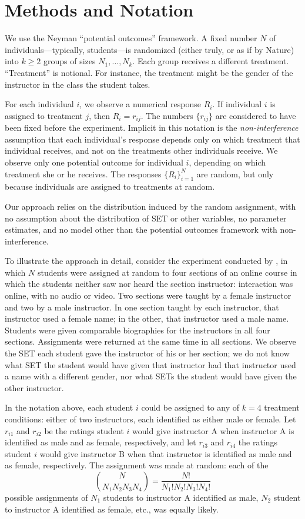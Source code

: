\documentclass[12pt]{article}
\newcommand{\beq}{\begin{equation}}
\newcommand{\eeq}{\end{equation}}
\begin{document}
\section{Methods and Notation}
We use the Neyman ``potential outcomes'' framework.
A fixed number $N$ of individuals---typically, students---is randomized (either truly, or
as if by Nature) into 
$k \ge 2$ groups of sizes $N_1, \ldots, N_k$.
Each group receives a different treatment.
``Treatment'' is notional. 
For instance, the treatment might be the gender of the
instructor in the class the student takes.

For each individual $i$, we observe a numerical response $R_i$.
If individual $i$ is assigned to treatment $j$, then $R_i = r_{ij}$.
The numbers $\{r_{ij}\}$ are considered to have been fixed before the experiment.
Implicit in this notation is the \emph{non-interference} assumption that
each individual's response depends only on which treatment that individual receives, 
and not on the treatments other individuals receive.
We observe only one potential outcome for individual $i$, 
depending on which treatment she or he receives.
The responses $\{R_i\}_{i=1}^N$ are random, but only because individuals are 
assigned to treatments at random.

Our approach relies on the distribution induced by the random
assignment, with no assumption about the distribution of SET or other variables, 
no parameter estimates, and no model other than the potential outcomes 
framework with non-interference.

To illustrate the approach in detail, consider the experiment conducted by \citet{MacNell2014},
in which $N$ students were assigned at random to four sections of an online course
in which the students neither saw nor heard the section instructor: interaction was online, with no
audio or video.
Two sections were taught by a female instructor and two by a male instructor.
In one section taught by each instructor, that instructor used a female name; in the other, 
that instructor used a male name.
Students were given comparable biographies for the instructors in all four sections.
Assignments were returned at the same time in all sections.
We observe the SET each student gave the instructor of his or her section;
we do not know what SET the student would have given that instructor had that instructor
used a name with a different gender, nor what SETs the student would have given the other instructor.

In the notation above, each student $i$ could be assigned to any of $k=4$ treatment conditions:
either of two instructors, each identified as either male or female.
Let $r_{i1}$ and $r_{i2}$ be the ratings student $i$ would give instructor A when instructor 
A is identified as male and as female, respectively, and let 
$r_{i3}$ and $r_{i4}$ the ratings student $i$ would give instructor B when that instructor
is identified as male and as female, respectively.
The assignment was made at random: each of the
\beq
 {{N}\choose{N_1 N_2 N_3 N_4}} = \frac{N!}{N_1! N_2! N_3! N_4!}
\eeq
possible assignments of $N_1$ students to instructor A identified as male,
$N_2$ student to instructor A identified as female, etc., was equally likely.
\end{document}

